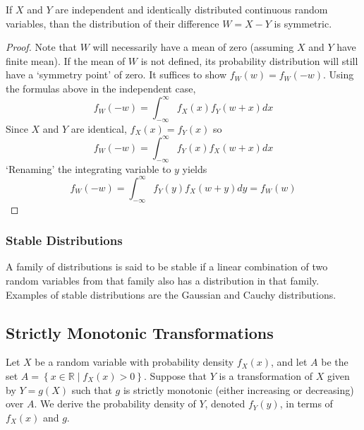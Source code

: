 \documentclass[11pt]{report} %
\begin{document}
\begin{theorem}
If $X$ and $Y$ are independent and identically distributed continuous random variables, than the distribution of their difference $W = X - Y$ is symmetric.
\end{theorem}
\begin{proof}
Note that $W$ will necessarily have a mean of zero (assuming $X$ and $Y$ have finite mean). If the mean of $W$ is not defined, its probability distribution will still have a `symmetry point' of zero. It suffices to show $f_{W}\left(w\right) = f_{W}\left(-w\right)$. Using the formulas above in the independent case,
\begin{equation}
f_{W}\left(-w\right) = \int_{-\infty}^{\infty}f_{X}\left(x\right)f_{Y}\left(w + x\right)dx
\end{equation}
Since $X$ and $Y$ are identical, $f_{X}\left(x\right) = f_{Y}\left(x\right)$ so
\begin{equation}
f_{W}\left(-w\right) = \int_{-\infty}^{\infty}f_{Y}\left(x\right)f_{X}\left(w + x\right)dx
\end{equation}
`Renaming' the integrating variable to $y$ yields
\begin{equation}
f_{W}\left(-w\right) = \int_{-\infty}^{\infty}f_{Y}\left(y\right)f_{X}\left(w + y\right)dy = f_{W}\left(w\right)
\end{equation}
\end{proof}

\subsubsection{Stable Distributions}

A family of distributions is said to be stable if a linear combination of two random variables from that family also has a distribution in that family. Examples of stable distributions are the Gaussian and Cauchy distributions.

\subsection{Strictly Monotonic Transformations}

Let $X$ be a random variable with probability density $f_{X}\left(x\right)$, and let $A$ be the set $A = \left\{x \in\mathbb{R}\middle| f_{X}\left(x\right) > 0\right\}$. Suppose that $Y$ is a transformation of $X$ given by $Y = g\left(X\right)$ such that $g$ is strictly monotonic (either increasing or decreasing) over $A$. We derive the probability density of $Y$, denoted $f_{Y}\left(y\right)$, in terms of $f_{X}\left(x\right)$ and $g$. \\
\end{document}
